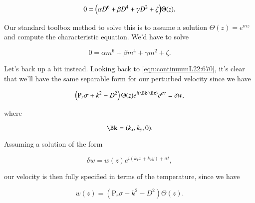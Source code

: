 \begin{equation}\label{eqn:continuumL22:890}
0 = \Bigl( \alpha D^6 + \beta D^4 + \gamma D^2 + \zeta \Bigr) \Theta(z).
\end{equation}

Our standard toolbox method to solve this is to assume a solution $\Theta(z) = e^{m z}$ and compute the characteristic equation.  We'd have to solve

\begin{equation}\label{eqn:continuumL22:910}
0 = \alpha m^6 + \beta m^4 + \gamma m^2 + \zeta.
\end{equation}

Let's back up a bit instead.  Looking back to \ref{eqn:continuumL22:670}, it's clear that we'll have the same separable form for our perturbed velocity since we have

\begin{equation}\label{eqn:continuumL22:670b}
\left( \text{P}_r \sigma + k^2 - D^2 \right) \Theta(z) e^{i (\Bk \cdot \Bx) } e^{\sigma t} = \delta w,
\end{equation}

where

\begin{equation}\label{eqn:continuumL22:930}
\Bk = (k_x, k_y, 0).
\end{equation}

Assuming a solution of the form

\begin{equation}\label{eqn:continuumL22:950}
\delta w = w(z) e^{ i ( k_1 x + k_2 y) + \sigma t},
\end{equation}

our velocity is then fully specified in terms of the temperature, since we have

\begin{equation}\label{eqn:continuumL22:970}
w(z) = \left( \text{P}_r \sigma + k^2 - D^2 \right) \Theta(z).
\end{equation}

%
%
%
%
%
%
%
%
%
%

